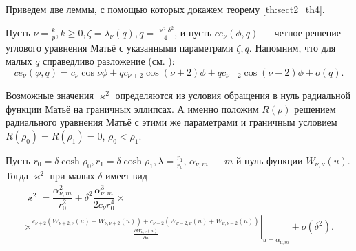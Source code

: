 Приведем две леммы, с помощью которых докажем теорему \ref{th:sect2_th4}.
\medskip

Пусть $\nu = \frac{k}{p}, k \geq 0, \zeta = \lambda_\nu(q), q=\frac{\varkappa^2 \delta^2}{4}$, и пусть $ce_\nu(\phi, q)$ --- четное решение углового уравнения Матьё с указанными параметрами $\zeta, q$. Напомним, что для малых $q$ справедливо разложение (см. \cite[\S~2.2, с.~122---124]{wref12}):
$$ce_\nu(\phi, q) = c_\nu \cos{\nu \phi} + q c_{\nu+2} \cos{(\nu+2) \phi} +q c_{\nu-2} \cos{(\nu-2) \phi} + o(q).$$ 

Возможные значения $\varkappa^2$ определяются из условия обращения в нуль радиальной функции Матьё на граничных эллипсах. А именно положим 
$R(\rho)$ решением радиального уравнения Матьё с этими же параметрами и граничным условием $R(\rho_0)=R(\rho_1)=0$, $\rho_0 < \rho_1$. 
\begin{lemma}
Пусть $r_0 = \delta\cosh{\rho_0}, r_1 = \delta\cosh{\rho_1}, \lambda = \frac{r_1}{r_0}$, $\alpha_{\nu, m}$ --- $m$-й нуль функции $W_{\nu, \nu}(u)$. Тогда $\varkappa^2$ при малых $\delta$ имеет вид
\begin{multline*}
\varkappa^2 = \dfrac{\alpha_{\nu, m}^2}{r_0^2} + \delta^2 \dfrac{\alpha_{\nu, m}^3}{2 c_\nu r_0^4} \times \\ \times \left. \frac{
c_{\nu+2} \left( W_{\nu+2, \nu}(u) + W_{\nu, \nu+2}(u) \right) + 
c_{\nu-2} \left( W_{\nu-2, \nu}(u) + W_{\nu, \nu-2}(u) \right)
}{ \frac{\partial W_{\nu,\nu}(u)}{\partial u} }\right|_{u=\alpha_{\nu, m}} + o(\delta^2).
\end{multline*}
\label{th:ringLemma1}
\end{lemma}

